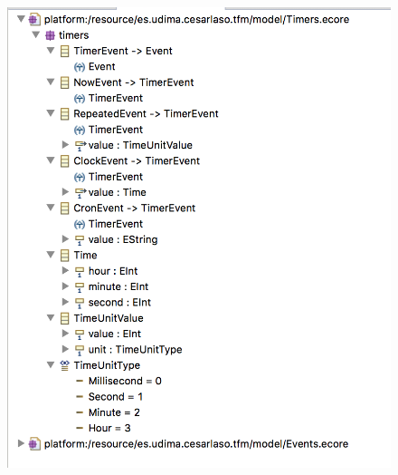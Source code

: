 \begin{figure}
	\centering
    \includegraphics[scale=0.5]{images/emf_capturas/timers_ecore.png}
    \sourcepropia{}
    \label{fig:modelo_timers_ecore}
\end{figure}
